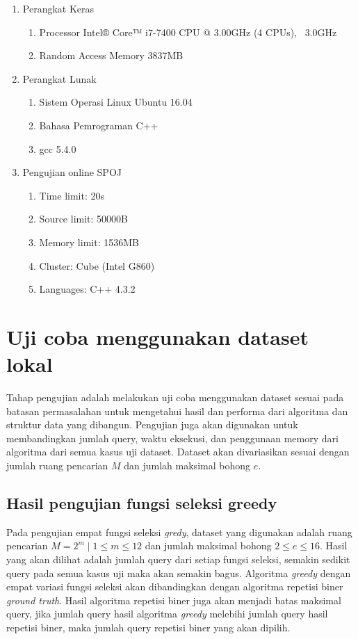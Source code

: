 \begin{enumerate}
  \item Perangkat Keras
  \begin{enumerate}
    \item Processor Intel® Core™ i7-7400 CPU @ 3.00GHz (4 CPUs), ~3.0GHz
    \item Random Access Memory 3837MB
  \end{enumerate}
  \item Perangkat Lunak
  \begin{enumerate}
    \item Sistem Operasi Linux Ubuntu 16.04
    \item Bahasa Pemrograman C++
    \item gcc 5.4.0
  \end{enumerate}
  \item Pengujian online SPOJ
  \begin{enumerate}
    \item Time limit: 20s
    \item Source limit: 50000B
    \item Memory limit: 1536MB
    \item Cluster: Cube (Intel G860)
    \item Languages: C++ 4.3.2
  \end{enumerate}
\end{enumerate}


\section{Uji coba menggunakan dataset lokal}

Tahap pengujian adalah melakukan uji coba menggunakan dataset sesuai pada batasan permasalahan untuk mengetahui hasil dan performa dari algoritma dan struktur data yang dibangun. Pengujian juga akan digunakan untuk membandingkan jumlah query, waktu eksekusi, dan penggunaan memory dari algoritma dari semua kasus uji dataset. Dataset akan divariasikan sesuai dengan jumlah ruang pencarian $M$ dan jumlah maksimal bohong $e$.


\subsection{Hasil pengujian fungsi seleksi greedy}

Pada pengujian empat fungsi seleksi \textit{gredy}, dataset yang digunakan adalah ruang pencarian $M=2^m \mid 1 \leq m \leq 12$ dan jumlah maksimal bohong $2 \leq e \leq 16$. Hasil yang akan dilihat adalah jumlah query dari setiap fungsi seleksi, semakin sedikit query pada semua kasus uji maka akan semakin bagus. Algoritma \textit{greedy} dengan empat variasi fungsi seleksi akan dibandingkan dengan algoritma repetisi biner \textit{ground truth}. Hasil algoritma repetisi biner juga akan menjadi batas maksimal query, jika jumlah query hasil algoritma \textit{greedy} melebihi jumlah query hasil repetisi biner, maka jumlah query repetisi biner yang akan dipilih.

